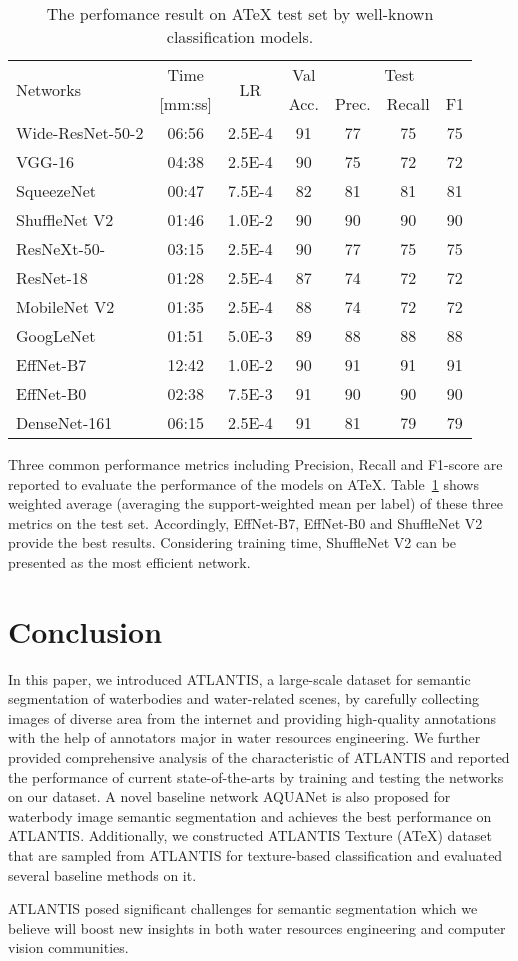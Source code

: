 \documentclass{article}
\begin{document}
\begin{table}
\centering
    \small
    \caption{The perfomance result on ATeX test set by well-known classification models.}
    \label{tab:model_results}
    \begin{tabular}{lcccccc}
        \toprule
        \multirow{2}{1pt}{Networks} & Time & \multirow{2}{*}{LR} & Val & \multicolumn{3}{c}{Test} \\
            & [mm:ss] &   & Acc. & Prec. & Recall & F1 \\
        \midrule
        Wide-ResNet-50-2 & 06:56 & 2.5E-4 & 91 & 77 & 75 & 75\\
        VGG-16 & 04:38 & 2.5E-4 & 90 & 75 & 72 & 72\\
        SqueezeNet & 00:47 & 7.5E-4 & 82 & 81 & 81 & 81\\
        ShuffleNet V2  & 01:46 & 1.0E-2 & 90 & 90 & 90 & 90\\
        ResNeXt-50- & 03:15 & 2.5E-4 & 90 & 77 & 75 & 75\\
        ResNet-18 & 01:28 & 2.5E-4 & 87 & 74 & 72 & 72\\
        MobileNet V2 & 01:35 & 2.5E-4 & 88 & 74 & 72 & 72\\
        GoogLeNet & 01:51 & 5.0E-3 & 89 & 88 & 88 & 88\\
        EffNet-B7 & 12:42 & 1.0E-2 & 90 & 91 & 91 & 91\\
        EffNet-B0 & 02:38 & 7.5E-3 & 91 & 90 & 90 & 90\\
        DenseNet-161 & 06:15 & 2.5E-4 & 91 & 81 & 79 & 79\\
        \bottomrule
    \end{tabular}
\end{table}

Three common performance metrics including Precision, Recall and F1-score are reported to evaluate the performance of the models on ATeX. Table~\ref{tab:model_results} shows weighted average (averaging the support-weighted mean per label) of these three metrics on the test set. Accordingly, EffNet-B7, EffNet-B0 and ShuffleNet V2  provide the best results. Considering training time, ShuffleNet V2  can be presented as the most efficient network.

\section{Conclusion} \label{sec:conclusion}
In this paper, we introduced ATLANTIS, a large-scale dataset for semantic segmentation of waterbodies and water-related scenes, by carefully collecting images of diverse area from the internet and providing high-quality annotations with the help of annotators major in water resources engineering. We further provided comprehensive analysis of the characteristic of ATLANTIS and reported the performance of current state-of-the-arts by training and testing the networks on our dataset. A novel baseline network AQUANet is also proposed for waterbody image semantic segmentation and achieves the best performance on ATLANTIS. Additionally, we constructed ATLANTIS Texture (ATeX) dataset that are sampled from ATLANTIS for texture-based classification and evaluated several baseline methods on it.

ATLANTIS posed significant challenges for semantic segmentation which we believe will boost new insights in both water resources engineering and computer vision communities.



  

\end{document}
